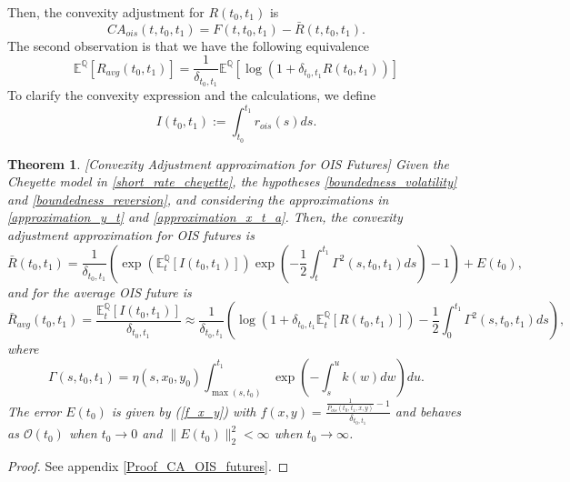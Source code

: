 \documentclass[a4paper,10pt]{article}
\newtheorem{theorem}{Theorem}[section]
\newcommand{\1}{\mathbf{1}}
\begin{document}
Then, the convexity adjustment for $ R(t_0,t_1)$ is
\begin{equation}\label{R_ois_ca}
CA_{ois}(t,t_0,t_1) = F(t,t_0,t_1) - \bar{R}(t,t_0,t_1).
\end{equation}
The second observation is that we have the following equivalence
\begin{equation}\label{R_ois_avg}
\mathbb{E}^{\mathbb{Q}}\left[R_{avg}(t_0,t_1) \right] =\frac{1}{\delta_{t_0,t_1}} \mathbb{E}^{\mathbb{Q}}\left[ \log\left(1+ \delta_{t_0,t_1} R(t_0,t_1) \right) \right]  \end{equation}
To clarify the convexity expression and the calculations, we define 
\begin{equation*}
I(t_0,t_1) := \int_{t_0}^{t_1} r_{ois}(s) ds.
\end{equation*}

\begin{theorem}\label{Th_CA_OIS}[Convexity Adjustment approximation for OIS Futures]
Given the Cheyette model in \eqref{short_rate_cheyette}, the hypotheses \ref{boundedness_volatility} and \ref{boundedness_reversion}, and considering the approximations in \eqref{approximation_y_t} and \eqref{approximation_x_t_a}. Then, the convexity adjustment approximation for OIS futures is 
\begin{equation}\label{convexity_ois_future}
\bar{R}(t_0,t_1) = \frac{1}{\delta_{t_0,t_1}}\left(\exp\left(\mathbb{E}_t^{\mathbb{Q}}\left[I(t_0,t_1)\right]\right)\exp\left(-\frac{1}{2}\int_{t}^{t_1}\Gamma^{2}(s,t_0,t_1) ds\right) - 1\right) + E(t_0),
\end{equation}
and for the average OIS future is
\begin{equation}\label{convexity_avg_ois_future}
\bar{R}_{avg}(t_0,t_1) = \frac{\mathbb{E}_t^{\mathbb{Q}}\left[I(t_0,t_1)\right] }{\delta_{t_0,t_1}} \approx \frac{1}{\delta_{t_0,t_1}}\left(\log\left(1+\delta_{t_0,t_1}  \mathbb{E}_t^{\mathbb{Q}}\left[R(t_0,t_1)\right] \right) - \frac{1}{2}\int_{0}^{t_1}  \Gamma^{2}(s,t_0,t_1) ds\right),
\end{equation}
where 
\begin{equation}
\Gamma(s,t_0,t_1)= \eta(s,x_0,y_0)\int_{\max(s, t_{0})}^{t_1} \exp\left( -\int_{s}^{u} k(w) dw\right)du.
\end{equation}
The error $E(t_0)$ is given by (\ref{f_x_y}) with $f(x,y)=\frac{\frac{1}{P_{ois}(t_0,t_1,x,y)} -1}{\delta_{t_0,t_1}}$ and behaves as $\mathcal{O}(t_0)$ when $t_0 \to 0$ and $\|E(t_0)\|^{2}_{2} < \infty$ when $t_0 \to \infty$.
\end{theorem}
\begin{proof}
See appendix \ref{Proof_CA_OIS_futures}.
\end{proof}
\end{document}
